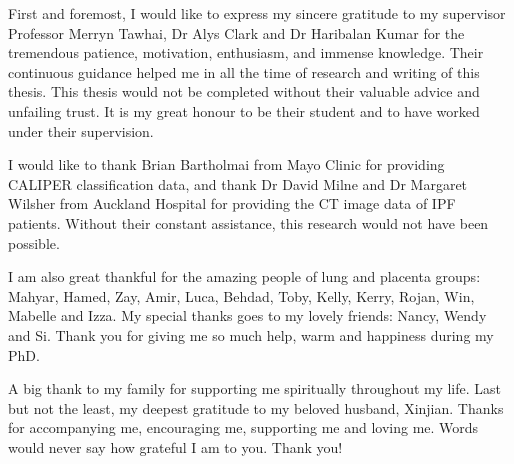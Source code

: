 \documentclass[a4paper, 12pt]{book}
\begin{document}
First and foremost, I would like to express my sincere gratitude to my supervisor Professor Merryn Tawhai, Dr Alys Clark and  Dr Haribalan Kumar for the tremendous patience, motivation, enthusiasm, and immense knowledge. Their continuous guidance helped me in all the time of research and writing of this thesis. This thesis would not be completed without their valuable advice and unfailing trust. It is my great honour to be their student and to have worked under their supervision.

I would like to thank Brian Bartholmai from Mayo Clinic for providing CALIPER classification data, and thank Dr David Milne and Dr Margaret Wilsher from Auckland Hospital for providing the CT image data of IPF patients. Without their constant assistance, this research would not have been possible.

I am also great thankful for the amazing people of lung and placenta groups: Mahyar, Hamed, Zay, Amir, Luca, Behdad, Toby, Kelly, Kerry, Rojan, Win, Mabelle and Izza. My special thanks goes to my lovely friends: Nancy, Wendy and Si. Thank you for giving me so much help, warm and happiness during my PhD.

A big thank to my family for supporting me spiritually throughout my life. Last but not the least, my deepest gratitude to my beloved husband, Xinjian. Thanks for accompanying me, encouraging me, supporting me and loving me. Words would never say how grateful I am to you. Thank you! 


\cleardoublepage
\renewcommand{\contentsname}{Table of Contents}
\tableofcontents
\addcontentsline{toc}{chapter}{\contentsname}

\cleardoublepage
\listoffigures
{}

\cleardoublepage
\listoftables
{}

\printglossary[type=\acronymtype,title={List of Abbreviations}]
{}

\mainmatter  



 



\begin{appendices}

\end{appendices}

\backmatter
 
\begingroup
\let\itshape\upshape
\renewcommand\bibname{List of References}
\setlength{\bibsep}{0pt plus 1ex}

\endgroup
\end{document}
